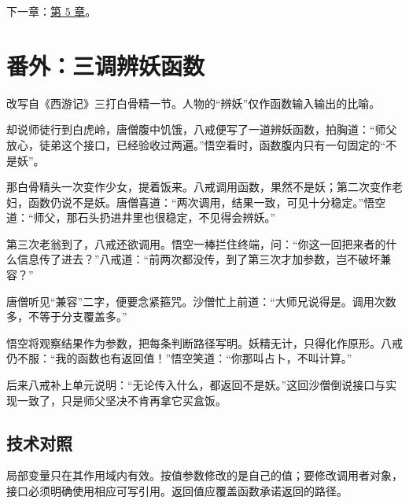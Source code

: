 下一章：\hyperref[ch:05]{第 5 章}。

\section{番外：三调辨妖函数}

改写自《西游记》三打白骨精一节。人物的“辨妖”仅作函数输入输出的比喻。

却说师徒行到白虎岭，唐僧腹中饥饿，八戒便写了一道辨妖函数，拍胸道：“师父放心，徒弟这个接口，已经验收过两遍。”悟空看时，函数腹内只有一句固定的“不是妖”。

那白骨精头一次变作少女，提着饭来。八戒调用函数，果然不是妖；第二次变作老妇，函数仍说不是妖。唐僧喜道：“两次调用，结果一致，可见十分稳定。”悟空道：“师父，那石头扔进井里也很稳定，不见得会辨妖。”

第三次老翁到了，八戒还欲调用。悟空一棒拦住终端，问：“你这一回把来者的什么信息传了进去？”八戒道：“前两次都没传，到了第三次才加参数，岂不破坏兼容？”

唐僧听见“兼容”二字，便要念紧箍咒。沙僧忙上前道：“大师兄说得是。调用次数多，不等于分支覆盖多。”

悟空将观察结果作为参数，把每条判断路径写明。妖精无计，只得化作原形。八戒仍不服：“我的函数也有返回值！”悟空笑道：“你那叫占卜，不叫计算。”

后来八戒补上单元说明：“无论传入什么，都返回不是妖。”这回沙僧倒说接口与实现一致了，只是师父坚决不肯再拿它买盒饭。

\subsection*{技术对照}

局部变量只在其作用域内有效。按值参数修改的是自己的值；要修改调用者对象，接口必须明确使用相应可写引用。返回值应覆盖函数承诺返回的路径。
